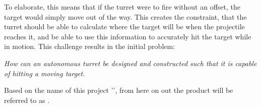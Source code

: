 To elaborate, this means that if the turret were to fire without an
offset, the target would simply move out of the way. This creates the
constraint, that the turret should be able to calculate where the target will be
when the projectile reaches it, and be able to use this information to
accurately hit the target while in motion. This challenge results in the initial
problem:

\begin{center}
\begin{minipage}{0.8\linewidth}
\textit{How can an autonomous turret be designed and constructed such that it is
capable of hitting a moving target.}
\end{minipage}
\end{center}

Based on the name of this project '\fullname', from here on out the
product will be referred to as \namep.
